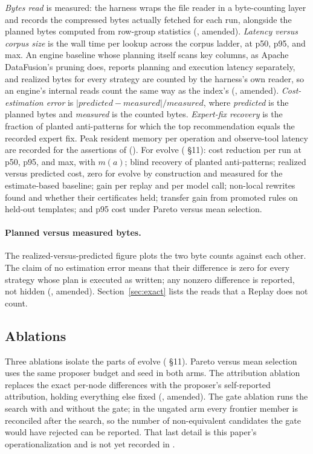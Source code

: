 \emph{Bytes read} is measured: the harness wraps the file reader in a
byte-counting layer and records the compressed bytes actually fetched for each
run, alongside the planned bytes computed from row-group statistics
(, amended). \emph{Latency versus corpus size} is the wall
time per lookup across the corpus ladder, at p50, p95, and max. An engine
baseline whose planning itself scans key columns, as Apache DataFusion's
pruning does, reports planning and execution latency separately, and realized
bytes for every strategy are counted by the harness's own reader, so an
engine's internal reads count the same way as the index's (,
amended).
\emph{Cost-estimation error} is
$|\mathit{predicted} - \mathit{measured}| / \mathit{measured}$, where
\emph{predicted} is the planned bytes and \emph{measured} is the counted bytes. \emph{Expert-fix recovery} is the fraction of planted anti-patterns for
which the top recommendation equals the recorded expert fix. Peak resident
memory per operation and observe-tool latency are recorded for the assertions of
 (). For evolve ( \S11): cost
reduction per run at p50, p95, and max, with $m(a)$; blind recovery of planted
anti-patterns; realized versus predicted cost, zero for evolve by construction
and measured for the estimate-based baseline; gain per replay and per model
call; non-local rewrites found and whether their certificates held; transfer
gain from promoted rules on held-out templates; and p95 cost under Pareto versus
mean selection.

\paragraph{Planned versus measured bytes.} The realized-versus-predicted figure
plots the two byte counts against each other. The claim of no estimation error
means that their difference is zero for every strategy whose plan is executed as
written; any nonzero difference is reported, not hidden (,
amended). Section~\ref{sec:exact} lists the reads that a Replay does not count.

\subsection{Ablations}\label{sec:ablations}

Three ablations isolate the parts of evolve ( \S11). Pareto
versus mean selection uses the same proposer budget and seed in both arms. The
attribution ablation replaces the exact per-node differences with the
proposer's self-reported attribution, holding everything else fixed
(, amended). The gate ablation runs the search with and
without the gate; in the ungated arm every frontier member is reconciled after
the search, so the number of non-equivalent candidates the gate would have
rejected can be reported. That last detail is this paper's operationalization
and is not yet recorded in .

